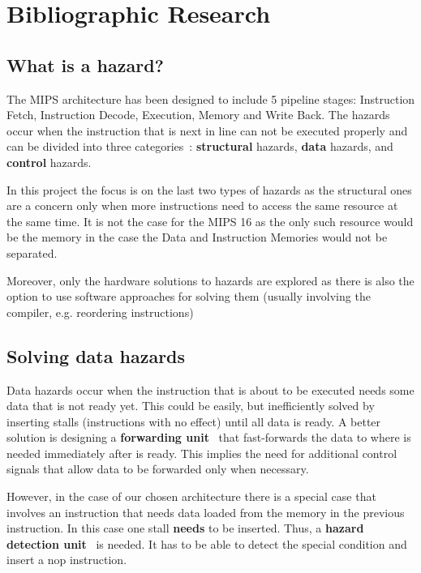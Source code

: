 \documentclass[a4paper,12pt]{report}
\begin{document}
\chapter{Bibliographic Research}
\section{What is a hazard?}
The MIPS architecture has been designed to include 5 pipeline stages: Instruction Fetch, Instruction Decode, Execution, Memory and Write Back. The hazards occur when the instruction that is next in line can not be executed properly and can be divided into three categories~\cite{patterson2014computer}: \textbf{structural} hazards, \textbf{data} hazards, and \textbf{control} hazards.

In this project the focus is on the last two types of hazards as the structural ones are a concern only when more instructions need to access the same resource at the same time. It is not the case for the MIPS 16 as the only such resource would be the memory in the case the Data and Instruction Memories would not be separated. 

Moreover, only the hardware solutions to hazards are explored as there is also the option to use software approaches for solving them (usually involving the compiler, e.g. reordering instructions)

\section{Solving data hazards}
Data hazards occur when the instruction that is about to be executed needs some data that is not ready yet. This could be easily, but inefficiently solved by inserting stalls (instructions with no effect) until all data is ready. A better solution is designing a \textbf{forwarding unit}~\cite{patterson2014computer} that fast-forwards the data to where is needed immediately after is ready. This implies the need for additional control signals that allow data to be forwarded only when necessary.

However, in the case of our chosen architecture there is a special case that involves an instruction that needs data loaded from the memory in the previous instruction. In this case one stall \textbf{needs} to be inserted. Thus, a \textbf{hazard detection unit}~\cite{patterson2014computer} is needed. It has to be able to detect the special condition and insert a nop instruction.
\end{document}
